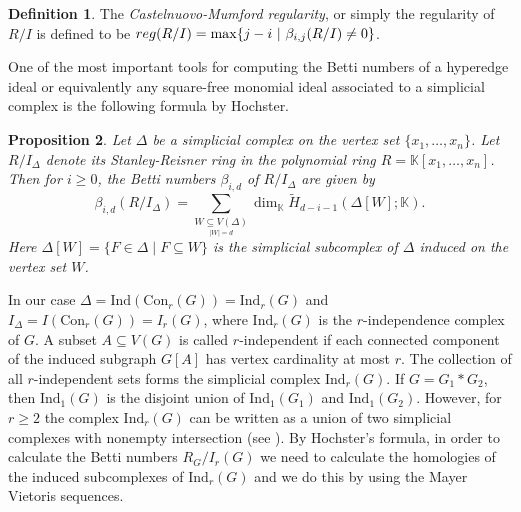 \documentclass[12pt,reqno]{amsart}
\newtheorem{proposition}{Proposition}[section]
\theoremstyle{definition}
\newtheorem{definition}[proposition]{Definition}
\def\C{\mathrm{Con}_r(G)}
\begin{document}
\begin{definition}
 The {\it Castelnuovo-Mumford regularity}, or simply the regularity of $R/I$ is defined
    to be ${\rm reg}(R/I) = \max\{j-i ~|~ \beta_{i,j}(R/I) \neq 0\}$.
\end{definition}


 One of the most important tools for computing the Betti numbers of a hyperedge ideal or equivalently any square-free monomial ideal associated to a simplicial complex is the following formula by Hochster.

\begin{proposition}\textup{\cite[Hochster's formula]{MH}}\label{Hochster}
Let $\Delta$ be a simplicial complex on the vertex set $\{x_1,\ldots,x_n\}$. Let $R/I_{\Delta}$ denote its Stanley-Reisner ring in the polynomial ring $R=\mathbb K[x_1,\ldots,x_n]$. Then for $i \geq 0$, the Betti numbers $\beta_{i,d}$ of $R/I_{\Delta}$ are given by 
{\footnotesize 
\[ \beta_{i,d}(R/I_{\Delta})= \sum_{\underset{|W|=d}{W \subseteq V(\Delta)}} \dim_{\mathbb{K}} \widetilde{H}_{d-i-1}(\Delta[W]; \mathbb{K}).\]} Here $\Delta[W]=\{F\in\Delta\mid F\subseteq W\}$  is the simplicial subcomplex of $\Delta$ induced on the vertex set $W$.
\end{proposition}

In our case $\Delta=\mathrm{Ind}(\C)=\mathrm{Ind}_r(G)$ and $I_{\Delta}=I(\C)=I_r(G)$, where $\mathrm{Ind}_r(G)$ is the $r$-independence complex of $G$. A subset $A\subseteq V(G)$ is called $r$-independent if each connected component of the induced subgraph $G[A]$ has vertex cardinality at most $r$. The collection of all $r$-independent sets forms the simplicial complex $\mathrm{Ind}_r(G)$. If $G=G_1*G_2$, then $\mathrm{Ind}_1(G)$ is the disjoint union of $\mathrm{Ind}_1(G_1)$ and $\mathrm{Ind}_1(G_2)$. However, for $r\ge 2$ the complex $\mathrm{Ind}_r(G)$ can be written as a union of two simplicial complexes with nonempty intersection (see ). By Hochster's formula, in order to calculate the Betti numbers $R_G/I_r(G)$ we need to calculate the homologies of the induced subcomplexes of $\mathrm{Ind}_r(G)$ and we do this by using the Mayer Vietoris sequences. 
\end{document}
